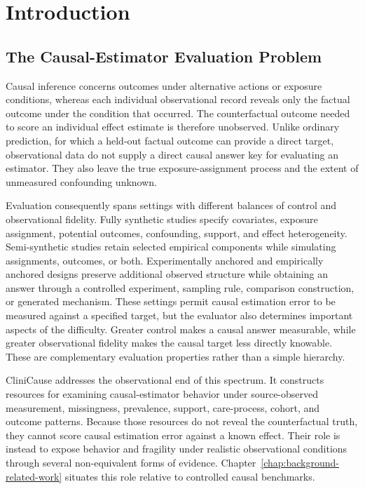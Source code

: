 \chapter{Introduction}
\label{chap:introduction}

\section{The Causal-Estimator Evaluation Problem}
\label{sec:introduction:causal-estimator-evaluation-problem}

Causal inference concerns outcomes under alternative actions or exposure conditions, whereas each individual observational record reveals only the factual outcome under the condition that occurred.  The counterfactual outcome needed to score an individual effect estimate is therefore unobserved.  Unlike ordinary prediction, for which a held-out factual outcome can provide a direct target, observational data do not supply a direct causal answer key for evaluating an estimator.  They also leave the true exposure-assignment process and the extent of unmeasured confounding unknown.

Evaluation consequently spans settings with different balances of control and observational fidelity.  Fully synthetic studies specify covariates, exposure assignment, potential outcomes, confounding, support, and effect heterogeneity.  Semi-synthetic studies retain selected empirical components while simulating assignments, outcomes, or both.  Experimentally anchored and empirically anchored designs preserve additional observed structure while obtaining an answer through a controlled experiment, sampling rule, comparison construction, or generated mechanism.  These settings permit causal estimation error to be measured against a specified target, but the evaluator also determines important aspects of the difficulty.  Greater control makes a causal answer measurable, while greater observational fidelity makes the causal target less directly knowable.  These are complementary evaluation properties rather than a simple hierarchy.

CliniCause addresses the observational end of this spectrum.  It constructs resources for examining causal-estimator behavior under source-observed measurement, missingness, prevalence, support, care-process, cohort, and outcome patterns.  Because those resources do not reveal the counterfactual truth, they cannot score causal estimation error against a known effect.  Their role is instead to expose behavior and fragility under realistic observational conditions through several non-equivalent forms of evidence.  Chapter~\ref{chap:background-related-work} situates this role relative to controlled causal benchmarks.

